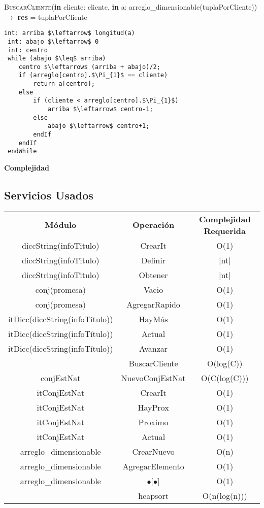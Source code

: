 \textsc{BuscarCliente}(\textbf{in} cliente: cliente, \textbf{in} a: arreglo\_dimensionable(tuplaPorCliente)) $\rightarrow$ \textbf{res} = tuplaPorCliente
\begin{lstlisting}[mathescape]
 int: arriba $\leftarrow$ longitud(a)
 int: abajo $\leftarrow$ 0
 int: centro
 while (abajo $\leq$ arriba)
 	centro $\leftarrow$ (arriba + abajo)/2;
    if (arreglo[centro].$\Pi_{1}$ == cliente)
 		return a[centro];
    else
 		if (cliente < arreglo[centro].$\Pi_{1}$)
   			arriba $\leftarrow$ centro-1;
 		else
   			abajo $\leftarrow$ centro+1;
   		endIf
   	endIf
 endWhile
\end{lstlisting}
\textbf{Complejidad}\\

\subsection{Servicios Usados}
\begin{center}
\begin{tabular*}{4\textwidth}{c |c | c }
\textbf{M\'odulo} & \textbf{Operaci\'on} & \textbf{Complejidad Requerida}\\
diccString(infoTitulo) & CrearIt & O(1)\\
diccString(infoTitulo) & Definir & |nt|\\
diccString(infoTitulo) & Obtener & |nt|\\
conj(promesa) & Vacio & O(1)\\
conj(promesa) & AgregarRapido & O(1)\\
itDicc(diccString(infoT\'itulo)) & HayM\'as & O(1)\\
itDicc(diccString(infoT\'itulo)) & Actual & O(1)\\
itDicc(diccString(infoT\'itulo)) & Avanzar & O(1)\\
& BuscarCliente & O(log(C))\\
conjEstNat & NuevoConjEstNat & O(C(log(C)))\\
itConjEstNat & CrearIt & O(1)\\
itConjEstNat & HayProx & O(1)\\
itConjEstNat & Proximo & O(1)\\
itConjEstNat & Actual & O(1)\\
arreglo\_dimensionable & CrearNuevo & O(n)\\
arreglo\_dimensionable & AgregarElemento & O(1)\\
arreglo\_dimensionable & $\bullet$[$\bullet$] & O(1)\\
& heapsort & O(n(log(n)))\\
\end{tabular*}
\end{center}
